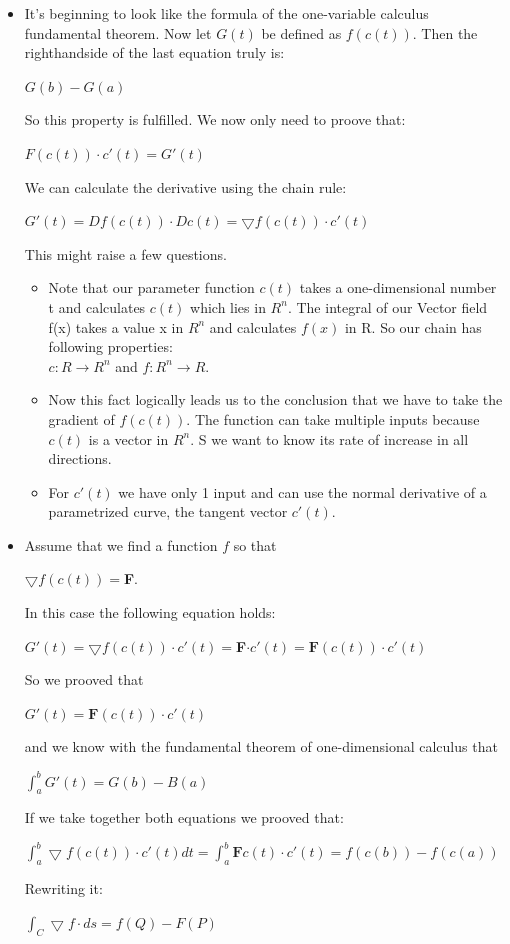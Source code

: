 \documentclass[12pt,a4paper]{article}
\begin{document}
\begin{itemize}
		\item It's beginning to look like the formula of the one-variable calculus fundamental theorem. Now let $G(t)$ be defined as $f(c(t))$. Then the righthandside of the last equation truly is: 
		\begin{center}
			$G(b)-G(a)$
		\end{center}So this property is fulfilled. We now only need to proove that: 
		\begin{center}
			$F(c(t)) \cdot c'(t) = G'(t)$
		\end{center}
		We can calculate the derivative using the chain rule:\\
		\begin{center}
			$G'(t) = Df(c(t))\cdot Dc(t) = \bigtriangledown f(c(t))\cdot c'(t)$
		\end{center}
		This might raise a few questions. 
		 \begin{itemize}
				\item Note that our parameter function $c(t)$ takes a one-dimensional number t and calculates $c(t)$ which lies in $R^n$. The integral of our Vector field f(x) takes a value x in $R^n$ and calculates $f(x)$ in R. So our chain has following properties: \\
		$c: R \rightarrow R^n$ and $f: R^n \rightarrow R$. 
			\item Now this fact logically leads us to the conclusion that we have to take the gradient of $f(c(t))$. The function can take multiple inputs because $c(t)$ is a vector in $R^n$. S we want to know its rate of increase in all directions. 
			\item For $c'(t)$ we have only 1 input and can use the normal derivative of a parametrized curve, the tangent vector $c'(t)$. 
		\end{itemize}
		
		\item Assume that we find a function $f$ so that  \begin{center} $\bigtriangledown f(c(t)) = $\textbf{F}.
		\end{center}
		In this case the following equation holds: 
		\begin{center}
			$G'(t) = \bigtriangledown f(c(t)) \cdot c'(t) = $\textbf{F}$ \cdot c'(t) = \textbf{F}(c(t))\cdot c'(t)$
		\end{center}
		
		So we prooved that
		\begin{center}
			$G'(t) = \textbf{F}(c(t))\cdot c'(t)$
		\end{center}
		and we know with the fundamental theorem of one-dimensional calculus that
		\begin{center}
			$\int_{a}^{b} G'(t) = G(b)-B(a)$
		\end{center}
		If we take together both equations we prooved that:
		\begin{center}
			$\int_{a}^{b} \bigtriangledown f(c(t))\cdot c'(t)dt = \int_{a}^{b} \textbf{F}c(t) \cdot c'(t) = f(c(b)) - f(c(a))$
		\end{center}
		Rewriting it:
		\begin{center}
			$\int_{C}^{}\bigtriangledown f\cdot ds = f(Q)-F(P)$
		\end{center}
		

\end{itemize}
\end{document}
